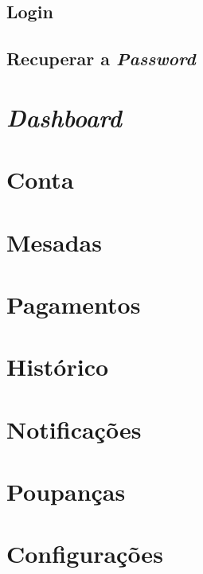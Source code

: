 \documentclass{article}
\begin{document}
  \subsection{Login}

  \subsection{Recuperar a \textit{Password}}

\section{\textit{Dashboard}}

\section{Conta}

\section{Mesadas}

\section{Pagamentos}

\section{Histórico}

\section{Notificações}

\section{Poupanças}

\section{Configurações}
\end{document}
